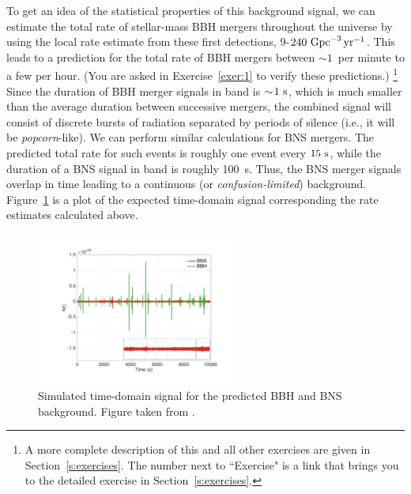 \documentclass[11pt]{article}
\numberwithin{equation}{section}
\begin{document}
To get an idea of the statistical properties of this
background signal, we can estimate the total rate of 
stellar-mass BBH mergers throughout the universe by
using the local rate estimate from these first detections,
$9$-$240~{\rm Gpc}^{-3}\,{\rm yr}^{-1}$.
This leads to a prediction for the total rate of 
BBH mergers between $\sim\!1$~per minute to a few per hour.
(You are asked in Exercise~\ref{exer:1} to verify
these predictions.)%
\footnote{A more complete description of this and 
all other exercises are given in 
Section~\ref{s:exercises}.
The number next to ``Exercise" is a link that brings 
you to the detailed exercise in Section~\ref{s:exercises}.}
Since the duration of BBH merger signals in band 
is $\sim\!1~{\rm s}$, which is much smaller than the 
average duration between successive mergers, the 
combined signal will consist of discrete bursts of 
radiation separated by periods of silence 
(i.e., it will be {\em popcorn}-like).
We can perform similar calculations for BNS mergers.
The predicted total rate for such events is roughly 
one event every $15~{\rm s}$, while the duration of 
a BNS signal in band is roughly 100~{\rm s}. 
Thus, the BNS merger signals overlap in time leading to 
a continuous (or {\em confusion-limited}) background.
Figure~\ref{f:BBH-BNS-timeseries} is a plot of the
expected time-domain signal corresponding the rate
estimates calculated above.
%
\begin{figure}[htbp!]
\begin{center}
\includegraphics[width=0.6\textwidth]{Figures/BBH-BNS-timeseries}
\caption{Simulated time-domain signal for the predicted BBH and 
BNS background.  
Figure taken from \cite{stoch-implications}.}
\label{f:BBH-BNS-timeseries}
\end{center}
\end{figure}
%
\end{document}
